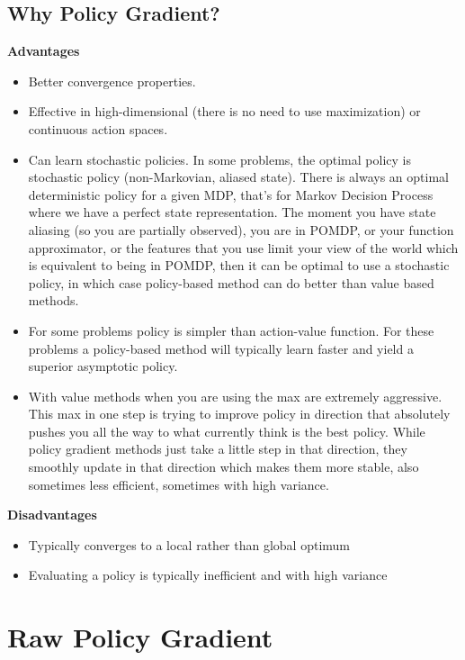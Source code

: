 \documentclass{article}
\begin{document}
\subsection{Why Policy Gradient?}
\textbf{Advantages}
\begin{itemize}
    \item Better convergence properties.
    
    \item Effective in high-dimensional (there is no need to use maximization) or continuous action spaces.
    
    \item Can learn stochastic policies. In some problems, the optimal policy is stochastic policy (non-Markovian, aliased state). There is always an optimal deterministic policy for a given MDP, that's for Markov Decision Process where we have a perfect state representation. The moment you have state aliasing (so you are partially observed), you are in POMDP, or your function approximator, or the features that you use limit your view of the world which is equivalent to being in POMDP, then it can be optimal to use a stochastic policy, in which case policy-based method can do better than value based methods.
    
    \item For some problems policy is simpler than action-value function. For these problems a policy-based method will typically learn faster and yield a superior asymptotic policy.
    
    \item With value methods when you are using the max are extremely aggressive. This max in one step is trying to improve policy in direction that absolutely pushes you all the way to what currently think is the best policy. While policy gradient methods just take a little step in that direction, they smoothly update in that direction which makes them more stable, also sometimes less efficient, sometimes with high variance.
\end{itemize}
\textbf{Disadvantages}
\begin{itemize}
    \item Typically converges to a local rather than global optimum
    \item Evaluating a policy is typically inefficient and with high variance
\end{itemize}

\newpage
\section{Raw Policy Gradient}
\end{document}
